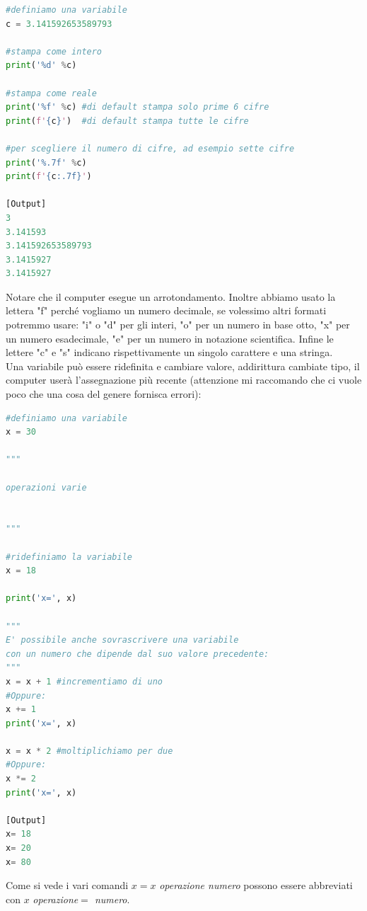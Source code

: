 \documentclass[10pt,a4paper]{article}
\begin{document}
\begin{lstlisting}[language=Python]
#definiamo una variabile
c = 3.141592653589793

#stampa come intero
print('%d' %c)

#stampa come reale
print('%f' %c) #di default stampa solo prime 6 cifre
print(f'{c}')  #di default stampa tutte le cifre

#per scegliere il numero di cifre, ad esempio sette cifre
print('%.7f' %c) 
print(f'{c:.7f}')

[Output]
3
3.141593
3.141592653589793
3.1415927
3.1415927
\end{lstlisting}
Notare che il computer esegue un arrotondamento. Inoltre abbiamo usato la lettera "f" perché vogliamo un numero decimale, se volessimo altri formati potremmo usare: "i" o "d" per gli interi, "o" per un numero in base otto, "x" per un numero esadecimale, "e" per un numero in notazione scientifica. Infine le lettere "c" e "s" indicano rispettivamente un singolo carattere e una stringa. \\
Una variabile può essere ridefinita e cambiare valore, addirittura cambiate tipo, il computer userà l'assegnazione più recente (attenzione mi raccomando che ci vuole poco che una cosa del genere fornisca errori):

\begin{lstlisting}[language=Python]
#definiamo una variabile
x = 30

"""

operazioni varie


"""

#ridefiniamo la variabile
x = 18

print('x=', x)

"""
E' possibile anche sovrascrivere una variabile
con un numero che dipende dal suo valore precedente:
"""
x = x + 1 #incrementiamo di uno
#Oppure:
x += 1
print('x=', x)

x = x * 2 #moltiplichiamo per due
#Oppure:
x *= 2
print('x=', x)

[Output]
x= 18
x= 20
x= 80

\end{lstlisting}
Come si vede i vari comandi $x = x $ \textit{operazione numero} possono essere abbreviati con $x$ \textit{operazione$=$ numero}.
\end{document}
